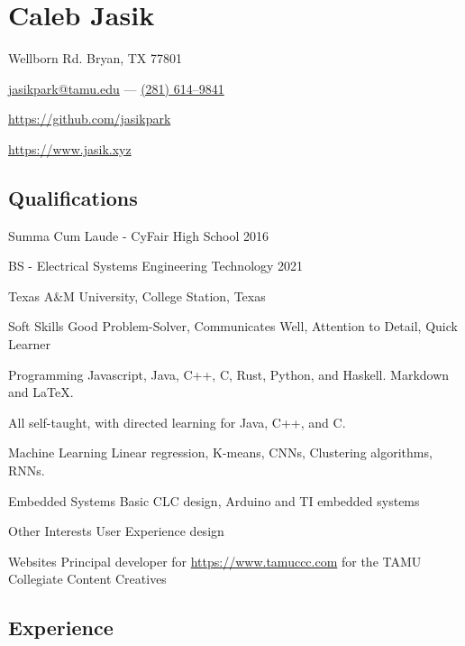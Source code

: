 \documentclass[letterpaper,10pt]{article}
\begin{document}
    \section{\Huge Caleb Jasik}\label{sec:hugecaleb-jasik}

    \hfill Wellborn Rd. Bryan, TX 77801

    \hfill \href{mailto:jasikpark@tamu.edu}{jasikpark@tamu.edu} ---
    \href{tel:2816149841}{(281) 614--9841}

    \hfill \href{https://github.com/jasikpark}{https://github.com/jasikpark}

    \hfill \href{https://jasik.xyz}{https://www.jasik.xyz}

    \subsection{Qualifications}\label{subsec:qualifications}

    Summa Cum Laude - CyFair High School 2016

    BS - Electrical Systems Engineering Technology 2021

    Texas A\&M University, College Station, Texas

    \begin{skills}
        \item[Soft Skills]
        Good Problem-Solver, Communicates Well, Attention to Detail, Quick Learner
        \item[Programming]
        Javascript, Java, C++, C, Rust, Python, and Haskell. Markdown and LaTeX.

        All self-taught, with directed learning for Java, C++, and C\@.
        \item[Machine Learning]
        Linear regression, K-means, CNNs, Clustering algorithms, RNNs.
        \item[Embedded Systems]
        Basic CLC design, Arduino and TI embedded systems
        \item[Other Interests]
        User Experience design
        \item[Websites]
        Principal developer for \href{https://www.tamuccc.com}{https://www.tamuccc.com} for the TAMU Collegiate Content Creatives
    \end{skills}


    \subsection{Experience}\label{subsec:experience}
\end{document}
